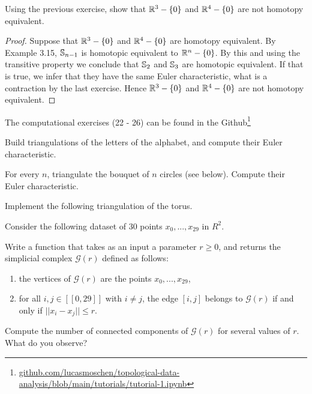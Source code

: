 \noindent\linia

\begin{exercise}
    Using the previous exercise, show that $\mathbb{R}^3 - \{0\}$ and $\mathbb{R}^4 - \{0\}$ are not homotopy equivalent.
\end{exercise}

\begin{proof}

Suppose that $\mathbb{R}^3 - \{0\}$ and $\mathbb{R}^4 - \{0\}$ are homotopy equivalent. By
Example 3.15, $\mathbb{S}_{n-1}$ is homotopic equivalent to $\mathbb{R}^n - \{0\}$. By
this and using the transitive property we conclude that $\mathbb{S}_2$ and
$\mathbb{S}_3$ are homotopic equivalent. If that is true, we infer that they have
the same Euler characteristic, what is a contraction by the last exercise.
Hence $\mathbb{R}^3 - \{0\}$ and $\mathbb{R}^4 - \{0\}$ are not homotopy equivalent.

\end{proof}

\noindent\linia

The computational exercises (22 - 26) can be found in the
Github\footnote{\url{github.com/lucasmoschen/topological-data-analysis/blob/main/tutorials/tutorial-1.ipynb}}

\begin{exercise}
    Build triangulations of the letters of the alphabet, and compute their Euler characteristic.
\end{exercise}

\begin{exercise}
    For every $n$, triangulate the bouquet of $n$ circles (see below). Compute
    their Euler characteristic.
\end{exercise}

\begin{exercise}
    Implement the following triangulation of the torus.
\end{exercise}

\begin{exercise}
    Consider the following dataset of 30 points $x_0, ..., x_{29}$ in $R^2$.

    Write a function that takes as an input a parameter $r \ge 0$, and returns
    the simplicial complex $\mathcal{G}(r)$ defined as follows:
    \begin{enumerate}
        \item the vertices of $\mathcal{G}(r)$ are the points $x_0, ..., x_{29}$,
        \item for all $i, j \in [[0, 29]]$ with $i \neq j$, the edge $[i, j]$ belongs to $\mathcal{G}(r)$ if and only if
        $||x_i - x_j|| \le r$.
    \end{enumerate}
    
    Compute the number of connected components of $\mathcal{G}(r)$ for several
    values of $r$. What do you observe?
\end{exercise}

